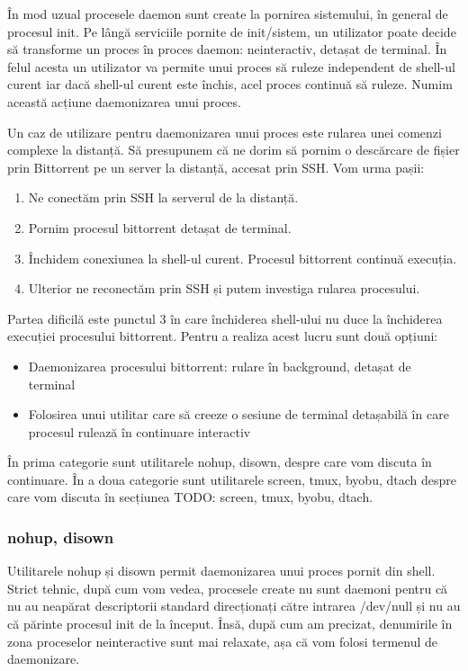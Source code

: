 În mod uzual procesele daemon sunt create la pornirea sistemului, în general de
procesul init. Pe lângă serviciile pornite de init/sistem, un utilizator poate
decide să transforme un proces în proces daemon: neinteractiv, detașat de
terminal. În felul acesta un utilizator va permite unui proces să ruleze
independent de shell-ul curent iar dacă shell-ul curent este închis, acel proces
continuă să ruleze. Numim această acțiune daemonizarea unui proces.

Un caz de utilizare pentru daemonizarea unui proces este rularea unei comenzi
complexe la distanță. Să presupunem că ne dorim să pornim o descărcare de fișier
prin Bittorrent pe un server la distanță, accesat prin SSH. Vom urma pașii:

\begin{enumerate}
	\item Ne conectăm prin SSH la serverul de la distanță.
	\item Pornim procesul bittorrent detașat de terminal.
	\item Închidem conexiunea la shell-ul curent. Procesul bittorrent
		continuă execuția.
	\item Ulterior ne reconectăm prin SSH și putem investiga rularea
		procesului.
\end{enumerate}

Partea dificilă este punctul 3 în care închiderea shell-ului nu duce la
închiderea execuției procesului bittorrent. Pentru a realiza acest lucru sunt
două opțiuni:

\begin{itemize}
	\item Daemonizarea procesului bittorrent: rulare în background, detașat de terminal
	\item Folosirea unui utilitar care să creeze o sesiune de terminal detașabilă în care procesul rulează în continuare interactiv
\end{itemize}

În prima categorie sunt utilitarele nohup, disown, despre care vom discuta în
continuare. În a doua categorie sunt utilitarele screen, tmux, byobu, dtach
despre care vom discuta în secțiunea TODO: screen, tmux, byobu, dtach.

\subsubsection{nohup, disown}
\label{sec:procese-interactivitate-detasare-nohup}

Utilitarele nohup și disown permit daemonizarea unui proces pornit din shell.
Strict tehnic, după cum vom vedea, procesele create nu sunt daemoni pentru că nu
au neapărat descriptorii standard direcționați către intrarea /dev/null și nu au
că părinte procesul init de la început. Însă, după cum am precizat, denumirile
în zona proceselor neinteractive sunt mai relaxate, așa că vom folosi termenul
de daemonizare.

